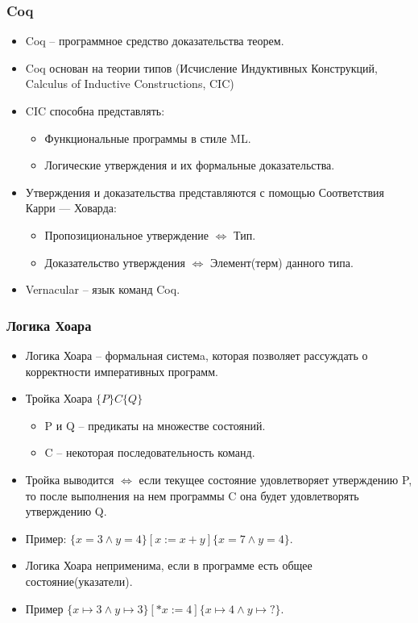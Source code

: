 \documentclass{beamer}
\begin{document}
\begin{frame}
	\frametitle{Coq}
	\begin{itemize}
		\item<2-> Coq -- программное средство доказательства теорем.
		\item<3-> Coq основан на теории типов (Исчисление Индуктивных Конструкций, Calculus of Inductive Constructions, CIC)
		\item<4-> CIC способна представлять:
		      \begin{itemize}
			      \item<5-> Функциональные программы в стиле ML.
			      \item<6-> Логические утверждения и их формальные доказательства.
		      \end{itemize}
		\item<7-> Утверждения и доказательства представляются с помощью Соответствия Карри — Ховарда:
		      \begin{itemize}
			      \item<8-> Пропозициональное утверждение $\iff$ Тип.
			      \item<9-> Доказательство утверждения $\iff$ Элемент(терм) данного типа.
		      \end{itemize}
		\item<10-> Vernacular -- язык команд Coq.
	\end{itemize}
\end{frame}

\begin{frame}
	\frametitle{Логика Хоара}
	\begin{itemize}
		\item<2-> Логика Хоара \cite{Hoare} -- формальная системa, которая позволяет рассуждать о корректности императивных программ.
		\item<3-> Тройка Хоара $\{P\}C\{Q\}$
		      \begin{itemize}
			      \item<4-> P и Q – предикаты на множестве состояний.
			      \item<5-> C – некоторая последовательность команд.
		      \end{itemize}
		\item<6-> Тройка выводится $\iff$ если текущее состояние удовлетворяет утверждению P,
		      то после выполнения на нем программы C она будет удовлетворять утверждению Q.
		\item<7-> Пример: $\{x = 3 \land y = 4\} [x := x + y] \{x = 7 \land y = 4\}$.
		\item<8-> Логика Хоара неприменима, если в программе есть общее состояние(указатели).
		\item<9-> Пример $\{x \mapsto 3 \land y \mapsto 3\}[*x := 4]\{x \mapsto 4 \land y \mapsto ?\}$.
	\end{itemize}
\end{frame}
\end{document}
